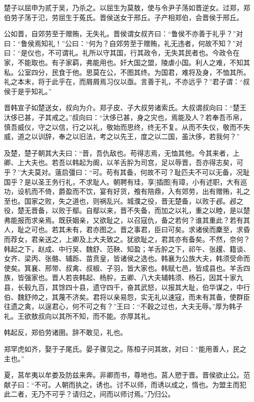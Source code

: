 \documentclass[a4paper,12pt,UTF8,twoside]{ctexbook}
\begin{document}
楚子以屈申为贰于吴，乃杀之。以屈生为莫敖，使与令尹子荡如晋逆女。过郑，郑伯劳子荡于氾，劳屈生于菟氏。晋侯送女于邢丘。子产相郑伯，会晋侯于邢丘。

公如晋，自郊劳至于赠贿，无失礼。晋侯谓女叔齐曰：“鲁侯不亦善于礼乎？”对曰：“鲁侯焉知礼！”公曰：“何为？自郊劳至于赠贿，礼无违者，何故不知？”对曰：“是仪也，不可谓礼。礼所以守其国，行其政令，无失其民者也。今政令在家，不能取也。有子家羁，弗能用也。奸大国之盟，陵虐小国。利人之难，不知其私。公室四分，民食于他。思莫在公，不图其终。为国君，难将及身，不恤其所。礼之本末，将于此乎在，而屑屑焉习仪以亟。言善于礼，不亦远乎？”君子谓：“叔侯于是乎知礼。”

晋韩宣子如楚送女，叔向为介。郑子皮、子大叔劳诸索氏。大叔谓叔向曰：“楚王汏侈已甚，子其戒之。”叔向曰：“汏侈已甚，身之灾也，焉能及人？若奉吾币帛，慎吾威仪，守之以信，行之以礼，敬始而思终，终无不复。从而不失仪，敬而不失威，道之以训辞，奉之以旧法，考之以先王，度之以二国，虽汏侈，若我何？”

及楚，楚子朝其大夫曰：“晋，吾仇敌也。苟得志焉，无恤其他。今其来者，上卿、上大夫也。若吾以韩起为阍，以羊舌肸为司宫，足以辱晋，吾亦得志矣，可乎？”大夫莫对。薳启彊曰：“可。苟有其备，何故不可？耻匹夫不可以无备，况耻国乎？是以圣王务行礼，不求耻人。朝聘有珪，享[插图]有璋，小有述职，大有巡功，设机而不倚，爵盈而不饮，宴有好货，飧有陪鼎，入有郊劳，出有赠贿，礼之至也。国家之败，失之道也，则祸乱兴。城濮之役，晋无楚备，以败于邲。邲之役，楚无晋备，以败于鄢。自鄢以来，晋不失备，而加之以礼，重之以睦，是以楚弗能报而求亲焉。既获姻亲，又欲耻之，以召寇仇，备之若何？谁其重此？若有其人，耻之可也。若其未有，君亦图之。晋之事君，臣曰可矣。求诸侯而麇至，求昏而荐女，君亲送之，上卿及上大夫致之。犹欲耻之，君其亦有备矣。不然，奈何？韩起之下，赵成、中行吴、魏舒、范鞅、知盈；羊舌肸之下，祁午、张趯、籍谈、女齐、梁丙、张骼、辅跞、苗贲皇，皆诸侯之选也。韩襄为公族大夫，韩须受命而使矣。箕襄、邢带、叔禽、叔椒、子羽，皆大家也。韩赋七邑，皆成县也。羊舌四族，皆强家也。晋人若丧韩起、杨肸，五卿、八大夫辅韩须、杨石，因其十家九县，长毂九百，其馀四十县，遗守四千，奋其武怒，以报其大耻，伯华谋之，中行伯、魏舒帅之，其蔑不济矣。君将以亲易怨，实无礼以速寇，而未有其备，使群臣往遗之禽，以逞君心，何不可之有？”王曰：“不穀之过也，大夫无辱。”厚为韩子礼。王欲敖叔向以其所不知，而不能。亦厚其礼。

韩起反，郑伯劳诸圉。辞不敢见，礼也。

郑罕虎如齐，娶于子尾氏。晏子骤见之。陈桓子问其故，对曰：“能用善人，民之主也。”

夏，莒牟夷以牟娄及防兹来奔。非卿而书，尊地也。莒人愬于晋。晋侯欲止公。范献子曰：“不可。人朝而执之，诱也。讨不以师，而诱以成之，惰也。为盟主而犯此二者，无乃不可乎？请归之，间而以师讨焉。”乃归公。
\end{document}
